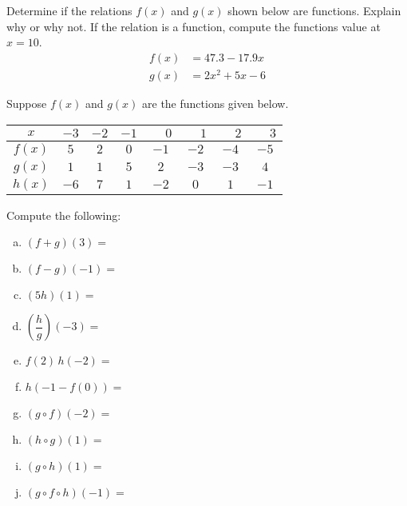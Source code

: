 \documentclass[11pt,letterpaper]{article}
\begin{document}
\newpage



 Determine if the relations $f(x)$ and $g(x)$ shown below are functions. Explain why or why not. If the relation is a function, compute the functions value at $x= 10$. 
	\[
	\begin{aligned}
	f(x)&= 47.3 - 17.9x \\[0.3cm]
	g(x)&= 2x^2 + 5x - 6
	\end{aligned}
	\]



\newpage



 Suppose $f(x)$ and $g(x)$ are the functions given below. 
        \begin{table}[!ht]
        \centering
        \begin{tabular}{| c || c | c | c | c | c | c | c |} \hline
	$x$ & $-3$ & $-2$ & $-1$ & $\phantom{-}0$ & $\phantom{-}1$ & $\phantom{-}2$ & $\phantom{-}3$ \\ \hline
	$f(x)$ & $5$ & $2$ & $0$ & $-1$ & $-2$ & $-4$ & $-5$ \\ \hline
	$g(x)$ & $1$ & $1$ & $5$ & $2$ & $-3$ & $-3$ & $4$ \\ \hline
	$h(x)$ & $-6$ & $7$ & $1$ & $-2$ & $0$ & $1$ & $-1$ \\ \hline
        \end{tabular}
        \end{table}

Compute the following: \pspace
        \begin{enumerate}[(a)]
        \item $(f + g)(3)=$ \vfill
        \item $(f - g)(-1)=$ \vfill
        \item $(5h)(1)=$ \vfill
        \item $\left(\dfrac{h}{g}\right)(-3)=$ \vfill
        \item $f(2)\, h(-2)=$ \vfill
        \item $h(-1 - f(0))=$ \vfill
        \item $(g \circ f)(-2)=$ \vfill
	\item $(h \circ g)(1)=$ \vfill
        \item $(g \circ h)(1)=$ \vfill
	\item $(g \circ f \circ h)(-1)=$ \vfill
        \end{enumerate} \pspace
\end{document}
